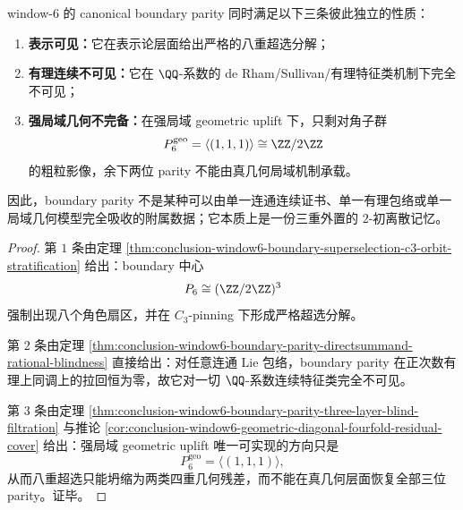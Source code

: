 \begin{theorem}\label{thm:conclusion-window6-boundary-parity-threefold-externality}
window-\(6\) 的 canonical boundary parity 同时满足以下三条彼此独立的性质：
\begin{enumerate}
  \item \textbf{表示可见：}它在表示论层面给出严格的八重超选分解；
  \item \textbf{有理连续不可见：}它在 \(\QQ\)-系数的 de Rham/Sullivan/有理特征类机制下完全不可见；
  \item \textbf{强局域几何不完备：}在强局域 geometric uplift 下，只剩对角子群
  \[
  P_6^{\mathrm{geo}}=\langle(1,1,1)\rangle\cong \ZZ/2\ZZ
  \]
  的粗粒影像，余下两位 parity 不能由真几何局域机制承载。
\end{enumerate}
因此，boundary parity 不是某种可以由单一连通连续证书、单一有理包络或单一局域几何模型完全吸收的附属数据；它本质上是一份三重外置的 \(2\)-初离散记忆。
\end{theorem}
\begin{proof}
第 \(1\) 条由定理 \ref{thm:conclusion-window6-boundary-superselection-c3-orbit-stratification} 给出：boundary 中心
\[
P_6\cong (\ZZ/2\ZZ)^3
\]
强制出现八个角色扇区，并在 \(C_3\)-pinning 下形成严格超选分解。

第 \(2\) 条由定理 \ref{thm:conclusion-window6-boundary-parity-directsummand-rational-blindness} 直接给出：对任意连通 Lie 包络，boundary parity 在正次数有理上同调上的拉回恒为零，故它对一切 \(\QQ\)-系数连续特征类完全不可见。

第 \(3\) 条由定理 \ref{thm:conclusion-window6-boundary-parity-three-layer-blind-filtration} 与推论 \ref{cor:conclusion-window6-geometric-diagonal-fourfold-residual-cover} 给出：强局域 geometric uplift 唯一可实现的方向只是
\[
P_6^{\mathrm{geo}}=\langle(1,1,1)\rangle,
\]
从而八重超选只能坍缩为两类四重几何残差，而不能在真几何层面恢复全部三位 parity。证毕。
\end{proof}

